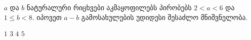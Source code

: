 \(a\) და \(b\) ნატურალური რიცხვები აკმაყოფილებს პირობებს \(2 < a < 6\) და \(1 \leq b < 8\). იპოვეთ \(a − b\) გამოსახულების უდიდესი შესაძლო მნიშვნელობა.

\answers
{\( 1 \)}
{\( 3 \)}
{\( 4 \)}
{\( 5 \)}